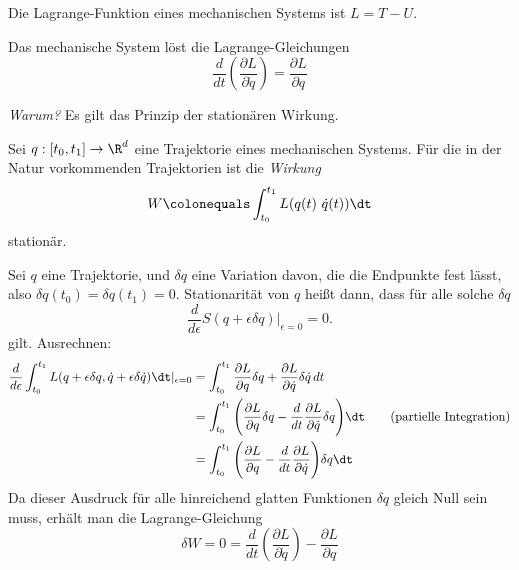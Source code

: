 \begin{definition}
	Die Lagrange-Funktion eines mechanischen Systems ist $L = T - U$.
\end{definition}

Das mechanische System löst die Lagrange-Gleichungen
\begin{equation*}
\frac{d}{dt} \left( \frac{\partial L}{\partial \dot q} \right) = \frac{\partial L}{\partial q}
\end{equation*}

\emph{Warum?} Es gilt das Prinzip der stationären Wirkung.

\begin{definition}
	Sei $q: [t_0, t_1] \to \R^d$ eine Trajektorie eines mechanischen Systems.
	Für die in der Natur vorkommenden Trajektorien ist die \textit{Wirkung}
	\begin{equation*}
	W \colonequals \int_{t_0}^{t_1} L(q(t) \ \dot q(t)) \dt
	\end{equation*}
	stationär.
\end{definition}

Sei $q$ eine Trajektorie, und $\delta q$ eine Variation davon, die die Endpunkte fest lässt, also $\delta q(t_0)=\delta q(t_1) = 0$.
Stationarität von $q$ heißt dann, dass für alle solche $\delta q$
\begin{equation*}
\frac{d}{d\epsilon} S(q+\epsilon\delta q)\vert_{\epsilon=0} = 0.
\end{equation*}
gilt. Ausrechnen:
\begin{align*}
\frac{d}{d\epsilon} \int_{t_0}^{t_1} L(q+ \epsilon\delta q,\dot q + \epsilon\delta \dot q)\dt\vert_{\epsilon=0} &= \int_{t_0}^{t_1} \frac{\partial L}{\partial q}\delta q + \frac{\partial L}{\partial\dot q} \delta\dot q\, dt \\
&= \int_{t_0}^{t_1} \Bigg(\frac{\partial L}{\partial q} \delta q - \frac{d}{dt} \frac{\partial L}{\partial \dot q} \delta q\Bigg)\dt \tag{partielle Integration} \\
&= \int_{t_0}^{t_1} \Bigg(\frac{\partial L}{\partial q} - \frac{d}{dt} \frac{\partial L}{\partial \dot q}  \Bigg)\delta q\dt
\end{align*}
Da dieser Ausdruck für alle hinreichend glatten Funktionen $\delta q$ gleich Null sein muss, erhält man die Lagrange-Gleichung
\begin{equation*}
\delta W = 0 = \frac{d}{dt} \left( \frac{\partial L}{\partial \dot q} \right) - \frac{\partial L}{\partial q}
\end{equation*}

